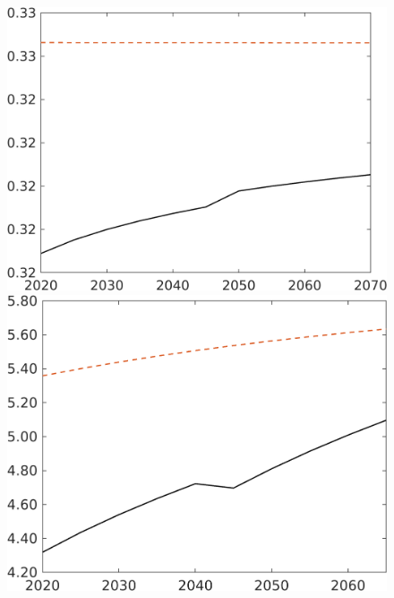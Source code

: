 \begin{figure}[h!!]
\begin{minipage}[]{0.32\textwidth}
\end{minipage}
\begin{minipage}[]{0.32\textwidth}
\includegraphics[width=1\textwidth]{../../codding_model/own_basedOnFried/optimalPol_190722_tidiedUp/figures/all_10Aout22/hl_LFCompOPT_T_NoTaus_regime3_spillover0_noskill0_sep1_xgrowth0_etaa0.79_lgd0.png}
\end{minipage}
\begin{minipage}[]{0.32\textwidth}
\includegraphics[width=1\textwidth]{../../codding_model/own_basedOnFried/optimalPol_190722_tidiedUp/figures/all_10Aout22/gAagg_LFCompOPT_T_NoTaus_regime3_spillover0_noskill0_sep1_xgrowth0_etaa0.79_lgd0.png}

\end{minipage}
\end{figure}
